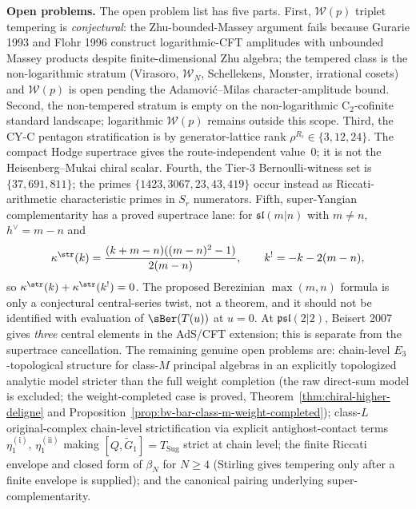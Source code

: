 \medskip\noindent\textbf{Open problems.}\enspace
The open problem list has five parts. First, $\mathcal{W}(p)$ triplet tempering is
\emph{conjectural}: the Zhu-bounded-Massey argument fails because
Gurarie 1993 and Flohr 1996 construct logarithmic-CFT amplitudes with
unbounded Massey products despite finite-dimensional Zhu algebra;
the tempered class is the non-logarithmic stratum (Virasoro,
$\mathcal{W}_N$, Schellekens, Monster, irrational cosets) and
$\mathcal{W}(p)$ is open pending the Adamovi\'c--Milas
character-amplitude bound. Second, the non-tempered stratum is
empty on the non-logarithmic C$_2$-cofinite standard landscape;
logarithmic $\mathcal{W}(p)$ remains outside this scope. Third, the
CY-C pentagon stratification is by generator-lattice rank
$\rho^{R_i} \in \{3, 12, 24\}$. The compact Hodge supertrace gives
the route-independent value~$0$; it is not the
Heisenberg--Mukai chiral scalar. Fourth, the
Tier-3 Bernoulli-witness set is
$\{37, 691, 811\}$; the primes
$\{1423, 3067, 23, 43, 419\}$ occur instead as
Riccati-arithmetic characteristic primes in $S_r$ numerators.
Fifth, super-Yangian complementarity has a proved supertrace lane:
for $\mathfrak{sl}(m|n)$ with $m\ne n$,
$h^\vee=m-n$ and
\[
  \kappa^{\str}(k)
  =
  \frac{(k+m-n)((m-n)^2-1)}{2(m-n)},\qquad
  k^!=-k-2(m-n),
\]
so $\kappa^{\str}(k)+\kappa^{\str}(k^!)=0$.  The proposed
Berezinian $\max(m,n)$ formula is only a conjectural central-series
twist, not a theorem, and it should not be identified with evaluation
of $\sBer(T(u))$ at $u=0$.  At $\mathfrak{psl}(2|2)$, Beisert 2007
gives \emph{three} central elements in the AdS/CFT extension; this is
separate from the supertrace cancellation. The remaining genuine
open problems are: chain-level $E_3$-topological
structure for class-$M$ principal algebras in an explicitly
topologized analytic model stricter than the full weight completion
(the raw direct-sum model is excluded; the weight-completed case is proved,
Theorem~\ref{thm:chiral-higher-deligne} and
Proposition~\ref{prop:bv-bar-class-m-weight-completed}); class-$L$
original-complex chain-level strictification via explicit
antighost-contact terms $\eta_1^{(\mathrm{i})}$,
$\eta_1^{(\mathrm{ii})}$ making
$[Q,\widetilde{G}_1] = T_{\mathrm{Sug}}$ strict at chain level; the
finite Riccati envelope and closed form of $\beta_N$ for $N \ge 4$
(Stirling gives tempering only after a finite envelope is supplied);
and the canonical pairing underlying super-complementarity.


